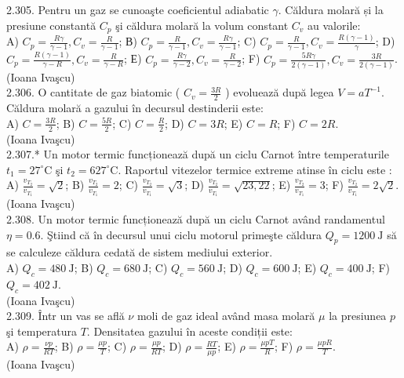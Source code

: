 2.305. Pentru un gaz se cunoaşte coeficientul adiabatic $\gamma$. Căldura molară și la presiune constantă $C_{p}$ şi căldura molară la volum constant $C_{v}$ au valorile:\\ A) $C_{p}=\frac{R \gamma}{\gamma-1} , C_{v}=\frac{R}{\gamma-1}$; В) $C_{p}=\frac{R}{\gamma-1} , C_{v}=\frac{R \gamma}{\gamma-1}$; C) $C_{p}=\frac{R}{\gamma-1} , C_{v}=\frac{R(\gamma-1)}{\gamma}$; D) $C_{p}=\frac{R(\gamma-1)}{\gamma-R} , C_{v}=\frac{R}{\gamma-R}$; Е) $C_{p}=\frac{R \gamma}{\gamma-2} , C_{v}=\frac{R}{\gamma-2}$; F) $C_{p}=\frac{5 R \gamma}{2(\gamma-1)} , C_{v}=\frac{3 R}{2(\gamma-1)}$.\\ (Ioana Ivaşcu)\\

2.306. O cantitate de gaz biatomic ( $C_{v}=\frac{3 R}{2}$ ) evoluează după legea $V=a T^{-1}$. Căldura molară a gazului în decursul destinderii este:\\ A) $C=\frac{3 R}{2}$; B) $C=\frac{5 R}{2}$; C) $C=\frac{R}{2}$; D) $C=3 R$; E) $C=R$; F) $C=2 R$.\\ (Ioana Ivaşcu)\\

2.307.* Un motor termic funcționează după un ciclu Carnot între temperaturile $t_{1}=27^{\circ} \mathrm{C}$ şi $t_{2}=627^{\circ} \mathrm{C}$. Raportul vitezelor termice extreme atinse în ciclu este :\\ A) $\frac{v_{T_{2}}}{v_{T_{1}}}=\sqrt{2}$; B) $\frac{v_{T_{2}}}{v_{T_{1}}}=2$; C) $\frac{v_{T_{2}}}{v_{T_{1}}}=\sqrt{3}$; D) $\frac{v_{T_{2}}}{v_{T_{1}}}=\sqrt{23,22}$; E) $\frac{v_{T_{2}}}{v_{T_{1}}}=3$; F) $\frac{v_{T_{2}}}{v_{T_{1}}}=2 \sqrt{2}$.\\ (Ioana Ivaşcu)\\

2.308. Un motor termic funcționează după un ciclu Carnot având randamentul $\eta=0.6$. Ştiind că în decursul unui ciclu motorul primeşte căldura $Q_{p}=1200 \mathrm{~J}$ să se calculeze căldura cedată de sistem mediului exterior.\\ A) $Q_{c}=480 \mathrm{~J}$; B) $Q_{c}=680 \mathrm{~J}$; C) $Q_{c}=560 \mathrm{~J}$; D) $Q_{c}=600 \mathrm{~J}$; E) $Q_{c}=400 \mathrm{~J}$; F) $Q_{c}=402 \mathrm{~J}$.\\ (Ioana Ivaşcu)\\

2.309. Într un vas se află $\nu$ moli de gaz ideal având masa molară $\mu$ la presiunea $p$ şi temperatura $T$. Densitatea gazului în aceste condiții este:\\ A) $\rho=\frac{\nu p}{R T}$; B) $\rho=\frac{\mu p}{T}$; C) $\rho=\frac{\mu p}{R T}$; D) $\rho=\frac{R T}{\mu p}$; E) $\rho=\frac{\mu p T}{R}$; F) $\rho=\frac{\mu p R}{T}$.\\ (Ioana Ivaşcu)\\

